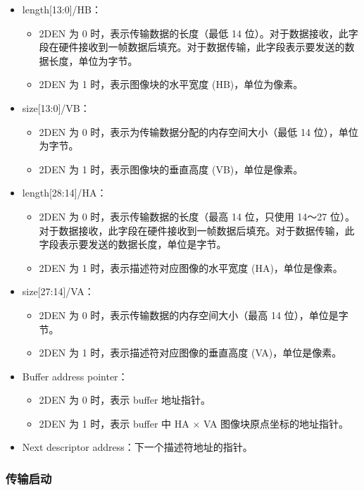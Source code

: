 \documentclass[main\_\_CN.tex]{subfiles}
\begin{document}
\begin{itemize}
\item length[13:0]/HB：
    \begin{itemize}
    \item 2DEN 为 0 时，表示传输数据的长度（最低 14 位）。对于数据接收，此字段在硬件接收到一帧数据后填充。对于数据传输，此字段表示要发送的数据长度，单位为字节。
    \item 2DEN 为 1 时，表示图像块的水平宽度 (HB)，单位为像素。
    \end{itemize}

\item size[13:0]/VB：
    \begin{itemize}
    \item 2DEN 为 0 时，表示为传输数据分配的内存空间大小（最低 14 位），单位为字节。
    \item 2DEN 为 1 时，表示图像块的垂直高度 (VB)，单位是像素。
    \end{itemize}
\item length[28:14]/HA：
    \begin{itemize}
    \item 2DEN 为 0 时，表示传输数据的长度（最高 14 位，只使用 14～27 位）。对于数据接收，此字段在硬件接收到一帧数据后填充。对于数据传输，此字段表示要发送的数据长度，单位是字节。
    \item 2DEN 为 1 时，表示描述符对应图像的水平宽度 (HA)，单位是像素。
    \end{itemize}
\item size[27:14]/VA：
    \begin{itemize}
    \item 2DEN 为 0 时，表示传输数据的内存空间大小（最高 14 位），单位是字节。
    \item 2DEN 为 1 时，表示描述符对应图像的垂直高度 (VA)，单位是像素。
    \end{itemize}
\item Buffer address pointer：
    \begin{itemize}
    \item 2DEN 为 0 时，表示 buffer 地址指针。
    \item 2DEN 为 1 时，表示 buffer 中 HA × VA 图像块原点坐标的地址指针。
    \end{itemize}
\item Next descriptor address：下一个描述符地址的指针。
\end{itemize}


\subsubsection{传输启动}\label{sec:h264-dma-start}
\end{document}
